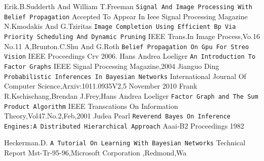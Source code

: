 \documentclass{raitdisser}
\begin{document}
\begin{thebibliography}{9}
Erik.B.Sudderth And William T.Freeman
\texttt{Signal And Image Processing With Belief Propagation}
Accepted To Appear In Ieee Signal Processing Magazine
\\
N.Kmodakis And G.Tziritas
\texttt{Image Completion Using Efficient Bp Via Priority Scheduling And Dynamic Pruning}
IEEE Trans.In Image Process,Vo.16 No.11
A,Brunton.C.Shu And G.Roth
\texttt{Belief Propagation On Gpu For Streo Vision}
IEEE Proceedings Crv 2006.
Hans Andrea Loeliger
\texttt{An Introduction To Factor Graphs}
IEEE Signal Processing Magazine,2004
Jianguo Ding
\texttt{Probabilistic Inferences In Bayesian Networks}
International Journal Of Computer Science,Arxiv:1011.0935V2,5 November 2010
Frank R.Kschischang,Brendan J.Frey,Hans Andrea Loeliger
\texttt{Factor Graph and The Sum Product Algorithm}
IEEE Transcations On Information Theory,Vol47.No.2,Feb,2001
Judea Pearl
\texttt{Reverend Bayes On Inference Engines:A Distributed Hierarchical Approach}
Aaai-B2 Proceedings 1982

Heckerman.D.
\texttt{A Tutorial On Learning With Bayesian Networks}
Technical Report Mst-Tr-95-96,Microsoft Corporation ,Redmond,Wa





\end{thebibliography}
%
\end{document}
